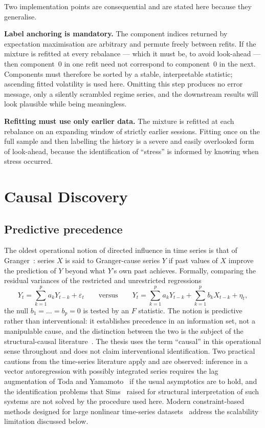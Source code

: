 Two implementation points are consequential and are stated here because they generalise.

\textbf{Label anchoring is mandatory.} The component indices returned by expectation
maximisation are arbitrary and permute freely between refits. If the mixture is refitted at
every rebalance --- which it must be, to avoid look-ahead --- then component~0 in one refit need
not correspond to component~0 in the next. Components must therefore be sorted by a stable,
interpretable statistic; ascending fitted volatility is used here. Omitting this step produces
no error message, only a silently scrambled regime series, and the downstream results will look
plausible while being meaningless.

\textbf{Refitting must use only earlier data.} The mixture is refitted at each rebalance on an
expanding window of strictly earlier sessions. Fitting once on the full sample and then
labelling the history is a severe and easily overlooked form of look-ahead, because the
identification of ``stress'' is informed by knowing when stress occurred.

\section{Causal Discovery}

\subsection{Predictive precedence}

The oldest operational notion of directed influence in time series is that of
Granger~\cite{granger1969}: series $X$ is said to Granger-cause series $Y$ if past values of
$X$ improve the prediction of $Y$ beyond what $Y$'s own past achieves. Formally, comparing the
residual variances of the restricted and unrestricted regressions
\begin{equation}
Y_t = \sum_{k=1}^{p}a_k Y_{t-k} + \varepsilon_t
\qquad\text{versus}\qquad
Y_t = \sum_{k=1}^{p}a_k Y_{t-k} + \sum_{k=1}^{p}b_k X_{t-k} + \eta_t,
\end{equation}
the null $b_1 = \dots = b_p = 0$ is tested by an $F$ statistic. The notion is predictive rather
than interventional: it establishes precedence in an information set, not a manipulable cause,
and the distinction between the two is the subject of the structural-causal
literature~\cite{pearl2009,peters2017}. The thesis uses the term ``causal'' in this operational
sense throughout and does not claim interventional identification. Two practical cautions from
the time-series literature apply and are observed: inference in a vector autoregression with
possibly integrated series requires the lag augmentation of Toda and
Yamamoto~\cite{toda1995} if the usual asymptotics are to hold, and the identification problems
that Sims~\cite{sims1980} raised for structural interpretation of such systems are not solved by
the procedure used here. Modern constraint-based methods designed for large nonlinear time-series
datasets~\cite{runge2019} address the scalability limitation discussed below.

